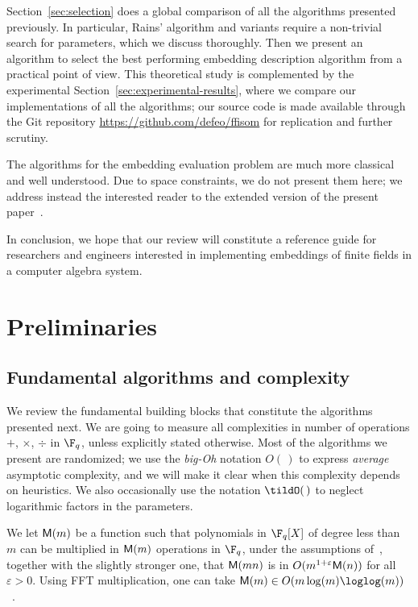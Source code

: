 Section~\ref{sec:selection} does a global comparison of all the
algorithms presented previously. %
In particular, Rains' algorithm and variants require a non-trivial
search for parameters, which we discuss thoroughly. %
Then we present an algorithm to select the best performing embedding
description algorithm from a practical point of view. %
This theoretical study is complemented by the experimental
Section~\ref{sec:experimental-results}, where we compare our
implementations of all the algorithms; our source code is made
available through the Git repository
\url{https://github.com/defeo/ffisom} for replication and further
scrutiny.

The algorithms for the embedding evaluation problem are much more
classical and well understood. %
Due to space constraints, we do not present them here; we address
instead the interested reader to the extended version of the present
paper~\cite{ffisom-long}.

In conclusion, we hope that our review will constitute a reference
guide for researchers and engineers interested in implementing
embeddings of finite fields in a computer algebra system.


\section{Preliminaries}
\label{sec:preliminaries}

\subsection{Fundamental algorithms and complexity}
\label{sec:fundamentalgo}
We review the fundamental building blocks that constitute the
algorithms presented next.  We are going to measure all complexities
in number of operations $+$, $\times$, $\div$ in $\F_q$, unless
explicitly stated otherwise. Most of the algorithms we present are
randomized; we use the \emph{big-Oh} notation $O(\,)$ to express {\em average}
asymptotic complexity, and we will make it clear when this complexity
depends on heuristics. We also occasionally use the notation
$\tildO(\,)$ to neglect logarithmic factors in the parameters.

We let $\mathsf{M}(m)$ be a function such that polynomials in $\F_q[X]$ of
degree less than $m$ can be multiplied in $\mathsf{M}(m)$ operations in
$\F_q$, under the assumptions of~\cite[Ch.~8.3]{vzGG}, together with
the slightly stronger one, that $\mathsf{M}(mn)$ is in $O(m^{1+\varepsilon}
\mathsf{M}(n))$ for all $\varepsilon > 0$. Using FFT multiplication, one can
take $\MM(m)\in O(m\log(m) \loglog(m))$~\cite{cantor+kaltofen91}.

